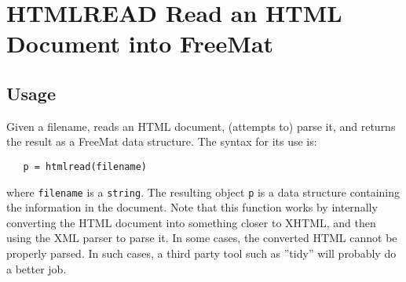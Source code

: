 \section{HTMLREAD Read an HTML Document into FreeMat}

\subsection{Usage}

Given a filename, reads an HTML document, (attempts to) parse it, and
returns the result as a FreeMat data structure.  The syntax for its
use is:
\begin{verbatim}
   p = htmlread(filename)
\end{verbatim}
where \verb|filename| is a \verb|string|.  The
resulting object \verb|p| is a data structure containing the information
in the document.  Note that this function works by internally converting
the HTML document into something closer to XHTML, and then using the
XML parser to parse it.  In some cases, the converted HTML cannot be properly
parsed.  In such cases, a third party tool such as ''tidy'' will probably do
a better job.
